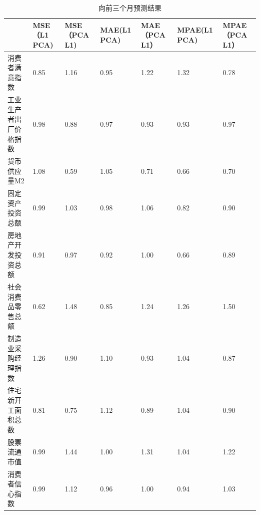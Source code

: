 \begin{table}[H]
    \centering
    \small
    \caption{向前三个月预测结果}
    \label{outcome5}
    \begin{tabularx}{\textwidth}{lXXXXXX}
    \toprule
                 &  MSE（L1 PCA) &  MSE（PCA L1) &  MAE(L1 PCA) &  MAE（PCA L1） &  MPAE(L1 PCA) &  MPAE（PCA L1） \\ \midrule
                 消费者满意指数    & 0.85            & 1.16        & 0.95            & 1.22        & 1.32             & 0.78         \\
    工业生产者出厂价格指数& 0.98            & 0.88        & 0.97            & 0.93        & 0.93             & 0.97         \\
    货币供应量M2       & 1.08            & 0.59        & 1.05            & 0.71        & 0.66             & 0.70         \\
    固定资产投资总额  & 0.99            & 1.03        & 0.98            & 1.06       & 0.82             & 0.90         \\
    房地产开发投资总额 & 0.91            & 0.97        & 0.92            & 1.00       & 0.66             & 0.89         \\
    社会消费品零售总额 & 0.62            & 1.48        & 0.85            & 1.24        & 1.26             & 1.50        \\
    制造业采购经理指数    & 1.26            & 0.90        & 1.10            & 0.93        & 1.04             & 0.87         \\
    住宅新开工面积总数   & 0.81            & 0.75        & 1.12            & 0.89        & 1.04             & 0.90         \\
    股票流通市值   & 0.99            & 1.44        & 1.00            & 1.31        & 1.04             & 1.22         \\
    消费者信心指数    & 0.99            & 1.12        & 0.96            & 1.00        & 0.94             & 1.03         \\ \bottomrule
    \end{tabularx}
\end{table}

